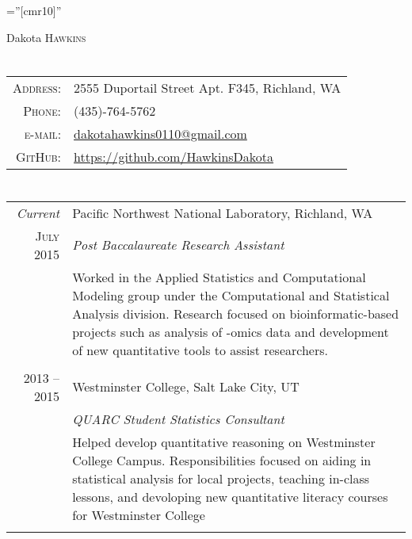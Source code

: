 \documentclass[a4paper,10pt]{article}
\begin{document}
\pagestyle{empty} %

\font\fb=''[cmr10]'' %

\par{\centering
		{\Huge Dakota \textsc{Hawkins}
	}\bigskip\par}

\section{\color{linkcolour}{Contact}}

\begin{tabular}{rl}
    \textsc{Address:} & 2555 Duportail Street Apt. F345, Richland, WA \\
    \textsc{Phone:}   & (435)-764-5762 \\
    \textsc{e-mail:}  & \href{mailto:dakotahawkins0110@gmail.com}{dakotahawkins0110@gmail.com} \\
    \textsc{GitHub:}  & \href{https://github.com/HawkinsDakota}{https://github.com/HawkinsDakota}
\end{tabular}

\section{\color{linkcolour}{Work Experience}}
\begin{tabular}{r|p{11cm}}
 \emph{Current}     & Pacific Northwest National Laboratory, Richland, WA \\
 \textsc{July 2015} & \emph{Post Baccalaureate Research Assistant} \\
                    & \footnotesize{Worked in the Applied Statistics and Computational Modeling group under the Computational and Statistical Analysis division. Research focused on bioinformatic-based projects such as analysis of -omics data and development of new quantitative tools to assist researchers.}\\
\multicolumn{2}{c}{} \\

\textsc{2013 -- 2015} & Westminster College, Salt Lake City, UT \\
 & \emph{QUARC Student Statistics Consultant}\\
 & \footnotesize{Helped develop quantitative reasoning on Westminster College Campus. Responsibilities focused on aiding in statistical analysis for local projects, teaching in-class lessons, and devoloping new quantitative literacy courses for Westminster College}\\\multicolumn{2}{c}{} \\
\end{tabular}
\end{document}
